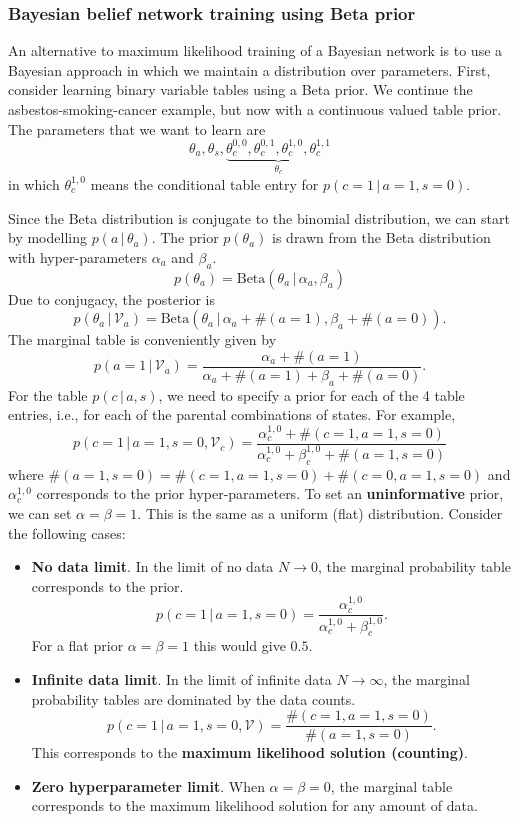 \documentclass{article}
\newcommand{\giv}{\,|\,}
\begin{document}
\subsubsection{Bayesian belief network training using Beta prior}

An alternative to maximum likelihood training of a Bayesian network is to use a Bayesian approach in which we maintain a distribution over parameters. First, consider learning binary variable tables using a Beta prior. We continue the asbestos-smoking-cancer example, but now with a continuous valued table prior. The parameters that we want to learn are 
$$
    \theta_a, \theta_s, \underbrace{\theta_c^{0, 0}, \theta_c^{0, 1}, \theta_c^{1, 0}, \theta_c^{1, 1}}_{\theta_c}
$$
in which $\theta_c^{1, 0}$ means the conditional table entry for $p(c = 1 \giv a = 1, s = 0)$. 

Since the Beta distribution is conjugate to the binomial distribution, we can start by modelling $p(a \giv \theta_a)$. The prior $p(\theta_a)$ is drawn from the Beta distribution with hyper-parameters $\alpha_a$ and $\beta_a$. 
$$
    p(\theta_a) = \text{Beta}(\theta_a \giv \alpha_a, \beta_a)
$$
\noindent Due to conjugacy, the posterior is 
$$
    p(\theta_a \giv \mathcal{V}_a) = \text{Beta}(\theta_a \giv \alpha_a + \#(a=1), \beta_a + \#(a=0)) .
$$
\noindent The marginal table is conveniently given by 
$$
    p(a = 1 \giv \mathcal{V}_a) = \frac{\alpha_a + \#(a=1)}{\alpha_a + \#(a=1) + \beta_a + \#(a=0)} .
$$
\noindent For the table $p(c \giv a, s)$, we need to specify a prior for each of the 4 table entries, i.e., for each of the parental combinations of states. For example, 
$$
    p(c = 1 \giv a = 1, s = 0, \mathcal{V}_c) = \frac{\alpha_c^{1, 0} + \#(c=1, a=1, s=0)}{\alpha_c^{1, 0} + \beta_c^{1, 0} + \#(a=1, s=0)}
$$
\noindent where $\#(a=1, s=0) = \#(c=1, a=1, s=0) + \#(c=0, a=1, s=0)$ and $\alpha_c^{1, 0}$ corresponds to the prior hyper-parameters. To set an \textbf{uninformative} prior, we can set $\alpha = \beta = 1$. This is the same as a uniform (flat) distribution. Consider the following cases:
\begin{itemize}
    \item[] \textbf{No data limit}. In the limit of no data $N \rightarrow 0$, the marginal probability table corresponds to the prior. 
    $$
        p(c = 1 \giv a = 1, s = 0) = \frac{\alpha_c^{1, 0}}{\alpha_c^{1, 0} + \beta_c^{1, 0}} .
    $$
    For a flat prior $\alpha = \beta = 1$ this would give $0.5$. 
    \item[] \textbf{Infinite data limit}. In the limit of infinite data $N \rightarrow \infty$, the marginal probability tables are dominated by the data counts. 
    $$
        p(c = 1 \giv a = 1, s = 0, \mathcal{V}) = \frac{\#(c=1, a=1, s=0)}{\#(a=1, s=0)} .
    $$
    This corresponds to the \textbf{maximum likelihood solution (counting)}. 
    \item[] \textbf{Zero hyperparameter limit}. When $\alpha = \beta = 0$, the marginal table corresponds to the maximum likelihood solution for any amount of data. 
\end{itemize}
\end{document}
